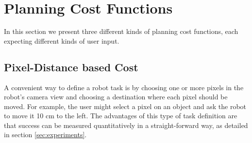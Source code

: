 \section{Planning Cost Functions}
\label{sec:cost}
In this section we present three different kinds of planning cost functions, each expecting different kinds of user input.


\subsection{Pixel-Distance based Cost}
\label{subsec:pixel_dist_cost}
A convenient way to define a robot task is by choosing one or more pixels in the robot's camera view and choosing a destination where each pixel should be moved. For example, the user might select a pixel on an object and ask the robot to move it 10 cm to the left. The advantages of this type of task definition are that success can be measured quantitatively in a straight-forward way, as detailed in section \ref{sec:experiments}.

 
